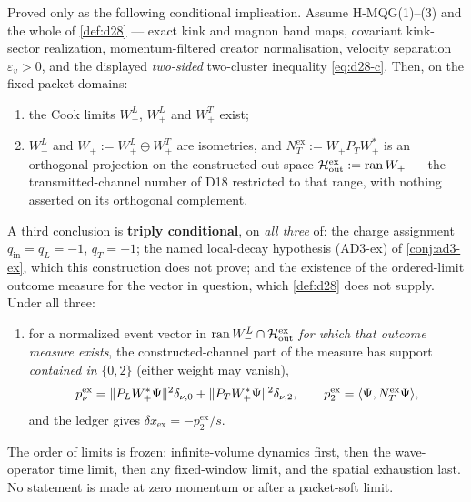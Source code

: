 \begin{theorem}
\label{thm:ac-ex}
\statusProvedConditional\;
Proved only as the following conditional implication. Assume H-MQG(1)--(3) and
the whole of \cref{def:d28} --- exact kink and magnon band maps, covariant
kink-sector realization, momentum-filtered creator normalisation, velocity
separation $\varepsilon_v>0$, and the displayed \emph{two-sided} two-cluster
inequality \eqref{eq:d28-c}. Then, on the fixed packet domains:
\begin{enumerate}
\item[(ACE.1)] the Cook limits $W_-^L$, $W_+^L$ and $W_+^T$ exist;
\item[(ACE.2)] $W_-^L$ and $W_+:=W_+^L\oplus W_+^T$ are isometries, and
$N_T^{\mathrm{ex}}:=W_+P_TW_+^*$ is an orthogonal projection on the
constructed out-space $\mathcal{H}_{\mathrm{out}}^{\mathrm{ex}}:=\operatorname{ran} W_+$ --- the
transmitted-channel number of D18 restricted to that range, with nothing
asserted on its orthogonal complement.
\end{enumerate}
A third conclusion is \textbf{triply conditional}, on \emph{all three} of: the
charge assignment $q_{\mathrm{in}}=q_L=-1$, $q_T=+1$; the named local-decay
hypothesis (AD3-ex) of \cref{conj:ad3-ex}, which this construction does not
prove; and the existence of the ordered-limit outcome measure for the vector in
question, which \cref{def:d28} does not supply. Under all three:
\begin{enumerate}
\item[(ACE.3)] for a normalized event vector in
$\operatorname{ran} W_-^L\cap\mathcal{H}_{\mathrm{out}}^{\mathrm{ex}}$ \emph{for which that outcome
measure exists}, the constructed-channel part of the measure has support
\emph{contained in} $\{0,2\}$ (either weight may vanish),
\begin{equation}
  p_\nu^{\mathrm{ex}}
  =\lVert P_LW_+^*\Psi\rVert^2\delta_{\nu,0}
  +\lVert P_TW_+^*\Psi\rVert^2\delta_{\nu,2},
  \qquad
  p_2^{\mathrm{ex}}=\langle \Psi,N_T^{\mathrm{ex}}\Psi\rangle,
  \label{eq:ace3-ledger}
\end{equation}
and the ledger gives $\delta x_{\mathrm{ex}}=-p_2^{\mathrm{ex}}/s$.
\end{enumerate}
The order of limits is frozen: infinite-volume dynamics first, then the
wave-operator time limit, then any fixed-window limit, and the spatial
exhaustion last. No statement is made at zero momentum or after a packet-soft
limit.
\end{theorem}

